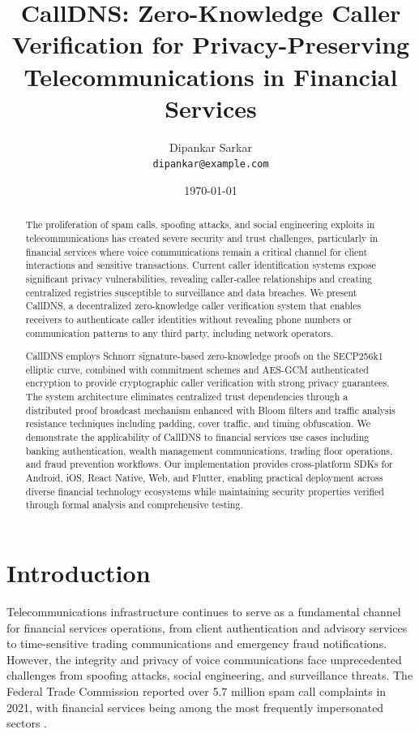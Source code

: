 \documentclass[11pt,twocolumn]{article}
\title{CallDNS: Zero-Knowledge Caller Verification for Privacy-Preserving Telecommunications in Financial Services}
\author{
  Dipankar Sarkar\\
  \texttt{dipankar@example.com}
}
\date{\today}
\begin{document}
\maketitle

\begin{abstract}
The proliferation of spam calls, spoofing attacks, and social engineering exploits in telecommunications has created severe security and trust challenges, particularly in financial services where voice communications remain a critical channel for client interactions and sensitive transactions. Current caller identification systems expose significant privacy vulnerabilities, revealing caller-callee relationships and creating centralized registries susceptible to surveillance and data breaches. We present CallDNS, a decentralized zero-knowledge caller verification system that enables receivers to authenticate caller identities without revealing phone numbers or communication patterns to any third party, including network operators.

CallDNS employs Schnorr signature-based zero-knowledge proofs on the SECP256k1 elliptic curve, combined with commitment schemes and AES-GCM authenticated encryption to provide cryptographic caller verification with strong privacy guarantees. The system architecture eliminates centralized trust dependencies through a distributed proof broadcast mechanism enhanced with Bloom filters and traffic analysis resistance techniques including padding, cover traffic, and timing obfuscation. We demonstrate the applicability of CallDNS to financial services use cases including banking authentication, wealth management communications, trading floor operations, and fraud prevention workflows. Our implementation provides cross-platform SDKs for Android, iOS, React Native, Web, and Flutter, enabling practical deployment across diverse financial technology ecosystems while maintaining security properties verified through formal analysis and comprehensive testing.
\end{abstract}

\section{Introduction}

Telecommunications infrastructure continues to serve as a fundamental channel for financial services operations, from client authentication and advisory services to time-sensitive trading communications and emergency fraud notifications. However, the integrity and privacy of voice communications face unprecedented challenges from spoofing attacks, social engineering, and surveillance threats. The Federal Trade Commission reported over 5.7 million spam call complaints in 2021, with financial services being among the most frequently impersonated sectors \cite{ftc2021}.
\end{document}
